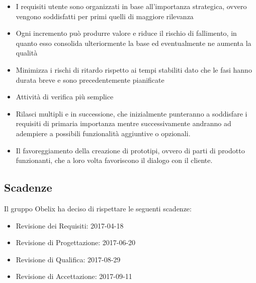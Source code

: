 \begin{itemize}
\item I requisiti utente sono organizzati in base all'importanza strategica, ovvero vengono soddisfatti per primi quelli di maggiore rilevanza
\item Ogni incremento può produrre valore e riduce il rischio di fallimento, in quanto esso
consolida ulteriormente la base ed eventualmente ne aumenta la qualità
\item Minimizza i rischi di ritardo rispetto ai tempi stabiliti dato che le fasi hanno durata breve e sono precedentemente pianificate
\item Attività di verifica più semplice
\item Rilasci multipli e in successione, che inizialmente punteranno a soddisfare i requisiti di primaria importanza mentre successivamente andranno ad adempiere a possibili funzionalità aggiuntive o opzionali.
\item Il favoreggiamento della creazione di prototipi, ovvero di parti di prodotto funzionanti, che a loro volta favoriscono
il dialogo con il cliente.

\end{itemize}


\subsection{Scadenze}

Il gruppo Obelix ha deciso di rispettare le seguenti scadenze:

\begin{itemize}

\item Revisione dei Requisiti: 2017-04-18
\item Revisione di Progettazione: 2017-06-20
\item Revisione di Qualifica: 2017-08-29
\item Revisione di Accettazione: 2017-09-11

\end{itemize}

